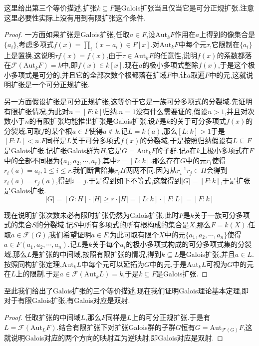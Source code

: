 这里给出第三个等价描述,扩张$k\subseteq F$是Galois扩张当且仅当它是可分正规扩张.注意这里必要性实际上没有用到有限扩张这个条件.
\begin{proof}
	
	一方面如果扩张是Galois扩张,任取$a\in F$,设$\mathrm{Aut}_kF$作用在$a$上得到的像集合是$\{a_i\}$,考虑多项式$f(x)=\prod_i(x-a_i)\in F[x]$.对$\mathrm{Aut}_kF$中每个元$\tau$,它限制在$\{a_i\}$上是置换,这说明$\tau f(x)=f(x)$,由于$\tau\in\mathrm{Aut}_kF$的任意性,说明$f(x)$的系数都落在$\mathscr{F}(\mathrm{Aut}_kF)=k$中,即$f(x)\in k[x]$.现在$a$的极小多项式整除$f(x)$,于是这个极小多项式是可分的,并且它的全部次数个根都落在扩域$F$中.让$a$取遍$F$中的元,这就说明扩张是一个可分正规扩张.
	
	另一方面假设扩张是可分正规扩张,这等价于它是一族可分多项式的分裂域.先证明有限扩张情况,为此对$n=[F:k]$归纳.$n=1$没有什么需要证的,假设$n>1$,并且对次数小于$n$的有限扩张均能推出扩张是Galois扩张.设$F$是$k$的关于可分多项式$f(x)$的分裂域.可取$f$的某个根$a\in F$使得$a\not\in k$.记$L=k(a)$,那么$[L:k]>1$于是$[F:L]<n$.$F$同样是$L$关于可分多项式$f(x)$的分裂域,于是按照归纳假设有$L\subseteq F$是Galois扩张.记扩张Galois群为$H$,它是$G=\mathrm{Aut}_kF$的子群.记$a$在$k$上极小多项式在$F$中的全部不同根为$\{a_1,a_2,\cdots,a_r\}$,其中$r=[L:k]$.那么存在$G$中的元$r_i$使得$r_i(a)=a_i,1\le i\le r$.我们断言陪集$r_iH$两两不同,因为从$r_i^{-1}r_j\in H$会得到$r_i(a)=r_j(a)$,得到$i=j$.于是得到如下不等式,这就得到$|G|=[F:k]$,于是扩张是Galois扩张.
	$$|G|=[G:H]\cdot|H|\ge r\cdot|H|=[L:k]\cdot[F:L]=[F:k]$$
	
	现在说明扩张次数未必有限时扩张仍然为Galois扩张.此时$F$是$k$关于一族可分多项式的集合$S$的分裂域.记$S$中所有多项式的所有根构成的集合是$X$,那么$F=k(X)$.任取$a\in\mathscr{F}(G)$,我们希望证明$a\in F$.为此可取有限个$X$中的元$\{a_1,a_2,\cdots,a_n\}$使得$a\in F(a_1,a_2,\cdots,a_n)$.记$L$是$k$关于每个$a_i$的极小多项式构成的可分多项式集的分裂域,那么$L$是扩张的中间域,按照有限扩张的情况,得到$k\subseteq L$是Galois扩张,并且$a\in L$.按照同构扩张定理,$\mathrm{Aut}_kL$中每个元可以延拓为$G$中的元,于是$\mathrm{Aut}_kL$可视为$G$中的元在$L$上的限制.于是$a\in\mathscr{F}(\mathrm{Aut}_kL)=k$,于是$k\subseteq F$是Galois扩张.
\end{proof}

至此我们给出了Galois扩张的三个等价描述,现在我们证明Galois理论基本定理,即对于有限Galois扩张,有Galois对应是双射.
\begin{proof}
	
	任取扩张的中间域$L$,那么$F$同样是$L$上的可分正规扩张.于是有$L=\mathscr{F}(\mathrm{Aut}_LF)$.结合有限扩张下对扩张Galois群的子群$G$恒有$G=\mathrm{Aut}_{\mathscr{F}(G)}F$,这就说明Galois对应的两个方向的映射互为逆映射,即Galois对应是双射.
\end{proof}

